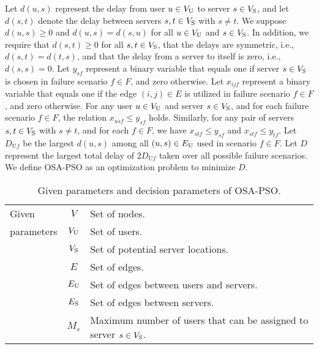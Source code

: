 \documentclass[10pt, letterpaper]{IEEEtran}
\begin{document}
\begin{CJK}{UTF8}{ipxm}
Let $d(u,s)$ represent the delay from user $u \in V_{\rm{U}}$ to server $s \in V_{\rm{S}}$, and let $d(s,t)$ denote the delay between servers $s, t \in V_{\rm{S}}$ with $s \neq t$.
We suppose $d(u,s) \geq 0$ and $d(u,s) = d(s,u)$ for all $u \in V_{\rm{U}}$ and $s \in V_{\rm{S}}$.
In addition, we require that $d(s,t) \geq 0$ for all $s, t \in V_{\rm{S}}$, that the delays are symmetric, i.e., $d(s,t) = d(t,s)$, and that the delay from a server to itself is zero, i.e., $d(s,s) = 0$.
Let $y_{sf}$ represent a binary variable that equals one if server $s \in V_{\rm{S}}$ is chosen in failure scenario $f \in F$, and zero otherwise.
Let $x_{ijf}$ represent a binary variable that equals one if the edge $(i,j) \in E$ is utilized in failure scenario $f \in F$, and zero otherwise.
For any user $u \in V_{\rm{U}}$ and server $s \in V_{\rm{S}}$, and for each failure scenario $f \in F$, the relation $x_{usf} \le y_{sf}$ holds. 
Similarly, for any pair of servers $s, t \in V_{\rm{S}}$ with $s \neq t$, and for each $f \in F$, we have $x_{stf} \le y_{sf}$ and $x_{stf} \le y_{tf}$. 
Let $D_{\mathrm{U}f}$ be the largest $d(u,s)$ among all $(u,s) \in E_{\rm{U}}$ used in scenario $f \in F$.
Let $D$ represent the largest total delay of $2D_{\mathrm{U}f}$ taken over all possible failure scenarios.
We define OSA-PSO as an optimization problem to minimize $D$.
% 
\begin{table}[tb]
    \centering
    \caption{Given parameters and decision parameters of OSA-PSO.}
    \label{tbl:notation_OSA-PSO}
    \begin{tabular}{p{1.3cm}|cp{5.4cm}}
        \hline
        \small
        Given & $V$ & Set of nodes. \\
        parameters & $V_{\rm{U}}$ & Set of users. \\
        & $V_{\rm{S}}$ & Set of potential server locations. \\
        & $E$ & Set of edges. \\
        & $E_{\rm{U}}$ & Set of edges between users and servers. \\
        & $E_{\rm{S}}$ & Set of edges between servers. \\
        & $M_s$ & Maximum number of users that can be assigned to server $s \in V_{\rm{S}}$. \\

\end{tabular}
\end{table}
\end{CJK}
\end{document}
